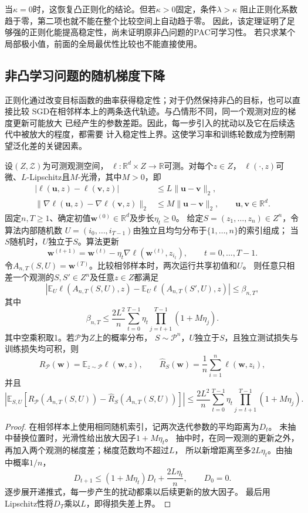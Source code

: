 当$\kappa=0$时，这恢复凸正则化的结论。但若$\kappa>0$固定，条件$\lambda>\kappa$
阻止正则化系数趋于零，第二项也就不能在整个比较空间上自动趋于零。
因此，该定理证明了足够强的正则化能提高稳定性，尚未证明原非凸问题的PAC可学习性。
若只求某个局部极小值，前面的全局最优性比较也不能直接使用。

\subsection{非凸学习问题的随机梯度下降}

正则化通过改变目标函数的曲率获得稳定性；对于仍然保持非凸的目标，也可以直接比较
SGD在相邻样本上的两条迭代轨迹。与凸情形不同，同一个观测对应的梯度更新可能放大
已经产生的参数差距。因此，每一步引入的扰动以及它在后续迭代中被放大的程度，都需要
计入稳定性上界。这使学习率和训练轮数成为控制期望泛化差的关键因素。

\begin{theorem}[非凸SGD的扰动传播]
\label{thm:nonconvex-sgd-product}
设$(Z,\mathcal Z)$为可测观测空间，
$\ell:\mathbb R^d\times Z\to\mathbb R$可测。对每个$z\in Z$，
$\ell(\cdot,z)$可微、$L$-Lipschitz且$M$-光滑，其中$M>0$，即
\[
\begin{aligned}
 |\ell(\bm u,z)-\ell(\bm v,z)|
 &\leq L\|\bm u-\bm v\|_2,\\
 \|\nabla\ell(\bm u,z)-\nabla\ell(\bm v,z)\|_2
 &\leq M\|\bm u-\bm v\|_2,
 \qquad \bm u,\bm v\in\mathbb R^d.
\end{aligned}
\]
固定$n,T\geq1$、确定初值$\bm w^{(0)}\in\mathbb R^d$及步长$\eta_t\geq0$。
给定$S=(z_1,\ldots,z_n)\in Z^n$，令算法内部随机数
$U=(i_0,\ldots,i_{T-1})$由独立且均匀分布于$\{1,\ldots,n\}$的索引组成；
当$S$随机时，$U$独立于$S$。算法更新
\[
 \bm w^{(t+1)}
 =\bm w^{(t)}-\eta_t\nabla\ell(\bm w^{(t)},z_{i_t}),
 \qquad t=0,\ldots,T-1.
\]
令$A_{n,T}(S,U)=\bm w^{(T)}$。比较相邻样本时，两次运行共享初值和$U$。
则任意只相差一个观测的$S,S'\in Z^n$及任意$z\in Z$都满足
\[
 \left|\mathbb E_U\ell(A_{n,T}(S,U),z)
 -\mathbb E_U\ell(A_{n,T}(S',U),z)\right|\leq\beta_{n,T},
\]
其中
\[
 \beta_{n,T}\leq\frac{2L^2}{n}
 \sum_{t=0}^{T-1}\eta_t\prod_{j=t+1}^{T-1}(1+M\eta_j).
\]
其中空乘积取1。若$\mathcal P$为$Z$上的概率分布，
$S\sim\mathcal P^n$，$U$独立于$S$，且独立测试损失与训练损失均可积，则
\[
 R_{\mathcal P}(\bm w)=\mathbb E_{z\sim\mathcal P}\ell(\bm w,z),
 \qquad
 \hat R_S(\bm w)=\frac1n\sum_{i=1}^n\ell(\bm w,z_i),
\]
并且
\[
 \left|\mathbb E_{S,U}
 [R_{\mathcal P}(A_{n,T}(S,U))-\hat R_S(A_{n,T}(S,U))]\right|
 \leq\frac{2L^2}{n}
 \sum_{t=0}^{T-1}\eta_t\prod_{j=t+1}^{T-1}(1+M\eta_j).
\]
\end{theorem}
\begin{proof}
在相邻样本上使用相同随机索引，记两次迭代参数的平均距离为$D_t$。
未抽中替换位置时，光滑性给出放大因子$1+M\eta_t$。
抽中时，在同一观测的更新之外，再加入两个观测的梯度差；梯度范数均不超过$L$，
所以新增距离至多$2L\eta_t$。由抽中概率$1/n$，
\[
 D_{t+1}\leq(1+M\eta_t)D_t+\frac{2L\eta_t}{n},\qquad D_0=0.
\]
逐步展开递推式，每一步产生的扰动都乘以后续更新的放大因子。
最后用Lipschitz性将$D_T$乘以$L$，即得损失差上界。
\end{proof}

